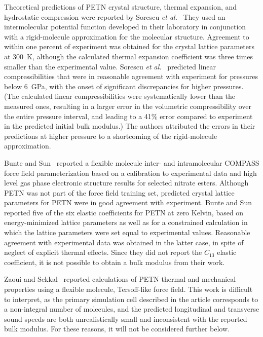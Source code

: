 \documentclass[prb,aps,nobibnotes,superbib,preprint]{revtex4}
\begin{document}
Theoretical predictions of PETN crystal structure, thermal expansion,
and hydrostatic compression were reported by Sorescu {\it et
al.}~\cite{Sorescu_1999v103A, Sorescu_1999v103} They used an
intermolecular potential function developed in their laboratory
in conjunction with a rigid-molecule 
approximation for the molecular structure. Agreement to within one percent 
of experiment was obtained for the crystal lattice parameters at 300~K, although
the calculated thermal expansion coefficient was three times smaller than the
experimental value.  Sorescu {\it et al.}~\cite{Sorescu_1999v103}
predicted linear compressibilities that were in reasonable agreement
with experiment for pressures below 6~GPa, with the onset of
significant discrepancies for higher pressures.  (The calculated
linear compressibilities were systematically lower than the measured
ones, resulting in a larger error in the volumetric compressibility
over the entire pressure interval, and leading to a 41\% error
compared to experiment in the predicted initial bulk modulus.) The
authors attributed the errors in their predictions at higher pressure
to a shortcoming of the rigid-molecule approximation.

Bunte and Sun~\cite{Bunte_2000v104} reported a flexible molecule
inter- and intramolecular COMPASS force field parameterization based
on a calibration to experimental data and high level gas phase
electronic structure results for selected nitrate esters.  Although
PETN was not part of the force field training set, predicted crystal
lattice parameters for PETN were in good agreement with experiment.
Bunte and Sun reported five of the six elastic coefficients for PETN
at zero Kelvin, based on energy-minimized lattice parameters as well
as for a constrained calculation in which the lattice parameters were
set equal to experimental values.  Reasonable agreement with
experimental data was obtained in the latter case, in spite of neglect
of explicit thermal effects.  Since they did not report the $C_{13}$
elastic coefficient, it is not possible to obtain a bulk modulus from
their work.

Zaoui and Sekkal~\cite{Zaoui_2001v118} reported calculations of PETN
thermal and mechanical properties using a flexible molecule, Tersoff-like force
field.  This work is difficult to interpret, as the primary simulation
cell described in the article corresponds to a non-integral number of
molecules, and the predicted longitudinal and transverse sound speeds
are both unrealistically small and inconsistent with the reported bulk
modulus.  For these reasons, it will not be considered further below.
\end{document}
